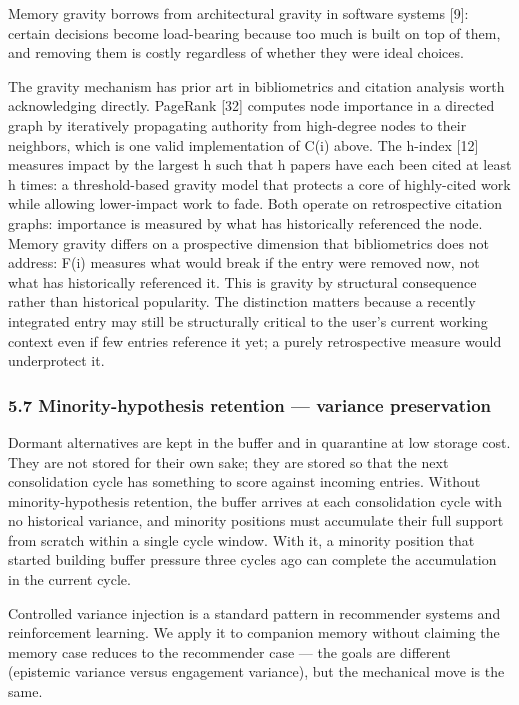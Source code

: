 \documentclass[
  11pt,
]{article}
\begin{document}
Memory gravity borrows from architectural gravity in software systems
{[}9{]}: certain decisions become load-bearing because too much is built
on top of them, and removing them is costly regardless of whether they
were ideal choices.

The gravity mechanism has prior art in bibliometrics and citation
analysis worth acknowledging directly. PageRank {[}32{]} computes node
importance in a directed graph by iteratively propagating authority from
high-degree nodes to their neighbors, which is one valid implementation
of C(i) above. The h-index {[}12{]} measures impact by the largest h
such that h papers have each been cited at least h times: a
threshold-based gravity model that protects a core of highly-cited work
while allowing lower-impact work to fade. Both operate on retrospective
citation graphs: importance is measured by what has historically
referenced the node. Memory gravity differs on a prospective dimension
that bibliometrics does not address: F(i) measures what would break if
the entry were removed now, not what has historically referenced it.
This is gravity by structural consequence rather than historical
popularity. The distinction matters because a recently integrated entry
may still be structurally critical to the user's current working context
even if few entries reference it yet; a purely retrospective measure
would underprotect it.

\hypertarget{minority-hypothesis-retention-variance-preservation}{%
\subsubsection{5.7 Minority-hypothesis retention --- variance
preservation}\label{minority-hypothesis-retention-variance-preservation}}

Dormant alternatives are kept in the buffer and in quarantine at low
storage cost. They are not stored for their own sake; they are stored so
that the next consolidation cycle has something to score against
incoming entries. Without minority-hypothesis retention, the buffer
arrives at each consolidation cycle with no historical variance, and
minority positions must accumulate their full support from scratch
within a single cycle window. With it, a minority position that started
building buffer pressure three cycles ago can complete the accumulation
in the current cycle.

Controlled variance injection is a standard pattern in recommender
systems and reinforcement learning. We apply it to companion memory
without claiming the memory case reduces to the recommender case --- the
goals are different (epistemic variance versus engagement variance), but
the mechanical move is the same.
\end{document}
